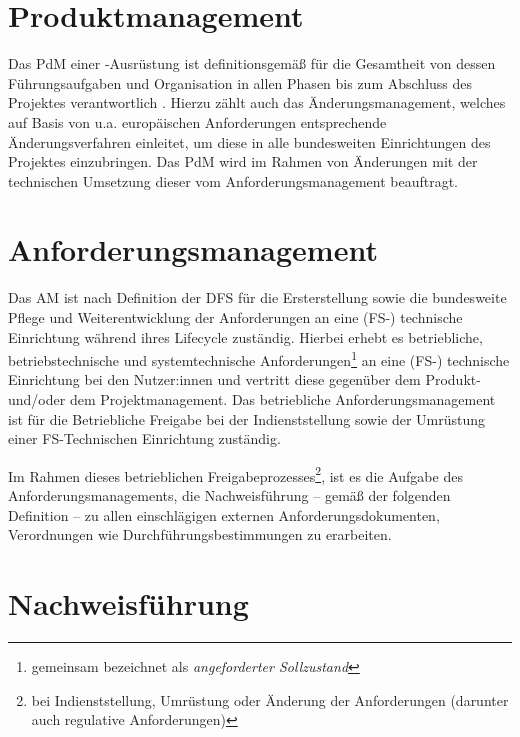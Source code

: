 \section{Produktmanagement}
    
    
    Das \ac{PdM} einer \atmans-Ausrüstung ist definitionsgemäß für die Gesamtheit von dessen Führungsaufgaben und Organisation in allen Phasen bis zum Abschluss des Projektes verantwortlich \cite[31]{ba_technik}.
    Hierzu zählt auch das Änderungsmanagement, welches auf Basis von u.a. europäischen Anforderungen entsprechende Änderungsverfahren einleitet, um diese in alle bundesweiten Einrichtungen des Projektes einzubringen. 
    Das \ac{PdM} wird im Rahmen von Änderungen mit der technischen Umsetzung dieser vom Anforderungsmanagement beauftragt.

\pagebreak
\section{Anforderungsmanagement}
    
    Das \acf{AM} ist nach Definition der \ac{DFS} für die Ersterstellung sowie die bundesweite Pflege und Weiterentwicklung der Anforderungen an eine (FS-) technische Einrichtung während ihres Lifecycle zuständig. 
    Hierbei erhebt es betriebliche, betriebstechnische und systemtechnische Anforderungen\footnote{gemeinsam bezeichnet als \textit{angeforderter Sollzustand}} an eine (FS-) technische Einrichtung bei den Nutzer:innen und vertritt diese gegenüber dem Produkt- und/oder dem Projektmanagement. 
    Das betriebliche Anforderungsmanagement ist für die Betriebliche Freigabe bei der Indienststellung sowie der Umrüstung einer FS-Technischen Einrichtung zuständig. \cite[31]{ba_technik}

    \medskip
    Im Rahmen dieses betrieblichen Freigabeprozesses\footnote{bei Indienststellung, Umrüstung oder Änderung der Anforderungen (darunter auch regulative Anforderungen)}, ist es die Aufgabe des Anforderungsmanagements, die Nachweisführung -- gemäß der folgenden Definition -- zu allen einschlägigen externen Anforderungsdokumenten, Verordnungen wie Durchführungsbestimmungen zu erarbeiten.
    
\section{Nachweisführung}
    
